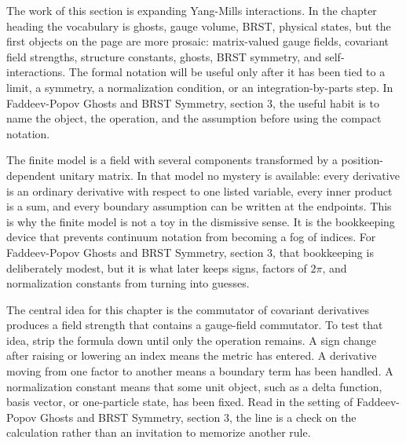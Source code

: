 











The work of this section is expanding Yang-Mills interactions.  In the chapter heading the vocabulary is ghosts, gauge volume, BRST, physical states, but the first objects on the page are more prosaic: matrix-valued gauge fields, covariant field strengths, structure constants, ghosts, BRST symmetry, and self-interactions.  The formal notation will be useful only after it has been tied to a limit, a symmetry, a normalization condition, or an integration-by-parts step.  In Faddeev-Popov Ghosts and BRST Symmetry, section 3, the useful habit is to name the object, the operation, and the assumption before using the compact notation.

The finite model is a field with several components transformed by a position-dependent unitary matrix.  In that model no mystery is available: every derivative is an ordinary derivative with respect to one listed variable, every inner product is a sum, and every boundary assumption can be written at the endpoints.  This is why the finite model is not a toy in the dismissive sense.  It is the bookkeeping device that prevents continuum notation from becoming a fog of indices.  For Faddeev-Popov Ghosts and BRST Symmetry, section 3, that bookkeeping is deliberately modest, but it is what later keeps signs, factors of \(2\pi\), and normalization constants from turning into guesses.

The central idea for this chapter is the commutator of covariant derivatives produces a field strength that contains a gauge-field commutator.  To test that idea, strip the formula down until only the operation remains.  A sign change after raising or lowering an index means the metric has entered.  A derivative moving from one factor to another means a boundary term has been handled.  A normalization constant means that some unit object, such as a delta function, basis vector, or one-particle state, has been fixed.  Read in the setting of Faddeev-Popov Ghosts and BRST Symmetry, section 3, the line is a check on the calculation rather than an invitation to memorize another rule.

